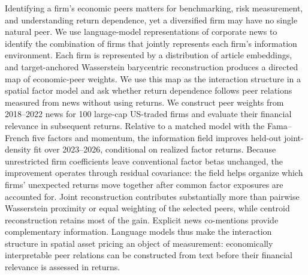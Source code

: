 Identifying a firm's economic peers matters for benchmarking, risk measurement,
and understanding return dependence, yet a diversified firm may have no single
natural peer.
We use language-model representations of corporate news to identify the
combination of firms that jointly represents each firm's information
environment.
Each firm is represented by a distribution of article embeddings, and
target-anchored Wasserstein barycentric reconstruction produces a directed map
of economic-peer weights.
We use this map as the interaction structure in a spatial factor model and ask
whether return dependence follows peer relations measured from news without
using returns.
We construct peer weights from 2018--2022 news for 100 large-cap US-traded
firms and evaluate their financial relevance in subsequent returns.
Relative to a matched model with the Fama--French five factors and momentum,
the information field improves held-out joint-density fit over 2023--2026,
conditional on realized factor returns.
Because unrestricted firm coefficients leave conventional factor betas
unchanged, the improvement operates through residual covariance: the field
helps organize which firms' unexpected returns move together after common
factor exposures are accounted for.
Joint reconstruction contributes substantially more than pairwise Wasserstein
proximity or equal weighting of the selected peers, while centroid
reconstruction retains most of the gain.
Explicit news co-mentions provide complementary information.
Language models thus make the interaction structure in spatial asset pricing
an object of measurement: economically interpretable peer relations can be
constructed from text before their financial relevance is assessed in returns.
